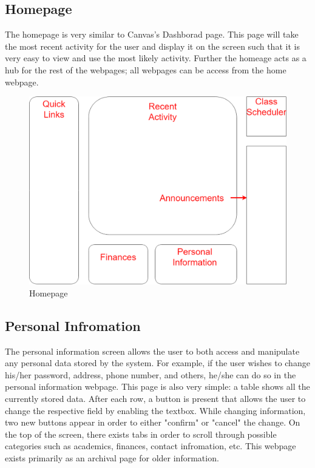 \documentclass{article}
\begin{document}
    \subsection{Homepage}\label{sec:Web:Home}
      The homepage is very similar to Canvas's Dashborad page.  This page will take the most recent activity for the user and display it on the screen such that it is very easy to view and use the most likely activity.  Further the homeage acts as a hub for the rest of the webpages; all webpages can be access from the home webpage.

      \begin{figure}[H]
        \centering
        \includegraphics[width=4 in]{Design/Homepage}
        \caption{Homepage}
        \label{fig:home}
      \end{figure}

    \subsection{Personal Infromation}\label{sec:Web:Personal}
      The personal information screen allows the user to both access and manipulate any personal data stored by the system.  For example, if the user wishes to change his/her password, address, phone number, and others, he/she can do so in the personal information webpage.  This page is also very simple: a table shows all the currently stored data.  After each row, a button is present that allows the user to change the respective field by enabling the textbox.  While changing information, two new buttons appear in order to either "confirm" or "cancel" the change.  On the top of the screen, there exists tabs in order to scroll through possible categories such as academics, finances, contact infromation, etc.  This webpage exists primarily as an archival page for older information.
\end{document}
